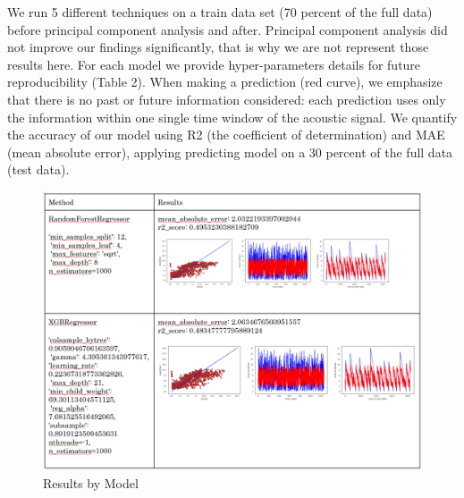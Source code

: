 \documentclass[]{llncs} %
\begin{document}
We run 5 different techniques on a train data set (70 percent of the full data) before principal component analysis and after. Principal component analysis did not improve our findings significantly, that is why we are not represent those results here. For each model we provide hyper-parameters details for future reproducibility (Table 2).
When making a prediction (red curve), we emphasize that there is no past or future information considered: each prediction uses only the information within one single time window of the acoustic signal. We quantify the accuracy of our model using R2 (the coefficient of determination) and MAE (mean absolute error), applying predicting model on a 30 percent of the full data (test data).



\begin{figure}
	\centering
	\includegraphics[width=1\linewidth]{../GPUProject/Results1.PNG}
	\caption{Results by Model}
	\label{fig:morethan90percentd}
\end{figure}
\end{document}
